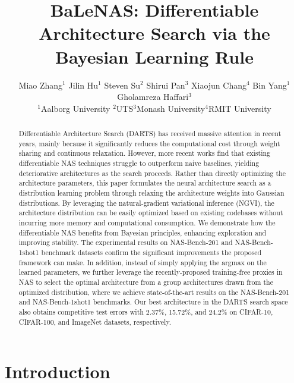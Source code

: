 \documentclass[10pt,twocolumn,letterpaper]{article}
\begin{document}
\title{BaLeNAS: Differentiable Architecture Search via the Bayesian Learning Rule}

\author{Miao Zhang$^{1}$ Jilin Hu$^{1}$ Steven Su$^{2}$ Shirui Pan$^{3}$ Xiaojun Chang$^{4}$ Bin Yang$^{1}$  Gholamreza Haffari$^{3}$\\
$^{1}$Aalborg University \quad $^{2}$UTS\quad $^{3}$Monash University\quad $^{4}$RMIT University\\



}
\maketitle

\begin{abstract}
Differentiable Architecture Search (DARTS) has received massive attention in recent years, mainly because it significantly reduces the computational cost through weight sharing and continuous relaxation. However, more recent works find that existing differentiable NAS techniques struggle to outperform naive baselines, yielding deteriorative architectures as the search proceeds. Rather than directly optimizing the architecture parameters, this paper formulates the neural architecture search as a distribution learning problem through relaxing the architecture weights into Gaussian distributions. By leveraging the natural-gradient variational inference (NGVI), the architecture distribution can be easily optimized based on existing codebases without incurring more memory and computational consumption. We demonstrate how the differentiable NAS benefits from Bayesian principles, enhancing exploration and improving stability. The experimental results on NAS-Bench-201 and NAS-Bench-1shot1 benchmark datasets confirm the significant improvements the proposed framework can make. In addition, instead of simply applying the argmax on the learned parameters, we further leverage the recently-proposed training-free proxies in NAS to select the optimal architecture from a group architectures drawn from the optimized distribution, where we achieve state-of-the-art results on the NAS-Bench-201 and NAS-Bench-1shot1 benchmarks. Our best architecture in the DARTS search space also obtains competitive test errors with 2.37\%, 15.72\%, and 24.2\% on CIFAR-10, CIFAR-100, and ImageNet datasets, respectively.
\end{abstract}





\section{Introduction}
\label{sec1}
\end{document}
